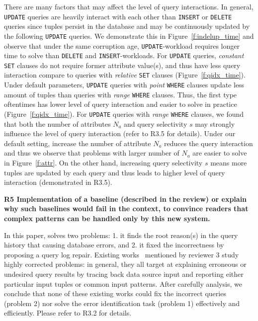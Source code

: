There are many factors that may affect the level of query interactions. In general, \texttt{UPDATE} queries are heavily interact with each other than \texttt{INSERT} or \texttt{DELETE} queries since tuples persist in the database and may be continuously updated by the following \texttt{UPDATE} queries. We demonstrate this in Figure~\ref{f:indelup_time} and observe that under the same corruption age, \texttt{UPDATE}-workload requires longer time to solve than \texttt{DELETE} and \texttt{INSERT}-workloads. For \texttt{UPDATE} queries, \textit{constant} \texttt{SET} clauses do not require former attribute value(s), and thus have less query interaction compare to queries with \textit{relative} \texttt{SET} clauses (Figure~\ref{f:qidx_time}). Under default parameters, \texttt{UPDATE} queries with \textit{point} \texttt{WHERE} clauses update less amount of tuples than queries with \textit{range} \texttt{WHERE} clauses. Thus, the first type oftentimes has lower level of query interaction and easier to solve in practice (Figure~\ref{f:qidx_time}). For \texttt{UPDATE} queries with \textit{range} \texttt{WHERE} clauses, we found that both the number of attributes $N_a$ and query selectivity $s$ may strongly influence the level of query interaction (refer to R3.5 for details). Under our default setting, increase the number of attribute $N_a$ reduces the query interaction and thus we observe that problems with larger number of $N_a$ are easier to solve in Figure~\ref{f:attr}. On the other hand, increasing query selectivity $s$ means more tuples are updated by each query and thus leads to higher level of query interaction (demonstrated in R3.5).


\noindent \textbf{R5 Implementation of a baseline (described in the review) or explain why such baselines would fail in the context, to convince readers that complex patterns can be handled only by this new system.}

In this paper, \sys solves two problems: 1. it finds the root reason(s) in the query history that causing database errors, and 2. it fixed the incorrectness by proposing a query log repair. Existing works~\cite{Wu13, roy2014formal, chalamalla2014,meliou2011tracing} mentioned by reviewer 3 study highly corrected problems: in general, they all target at explaining erroneous or undesired query results by tracing back data source input and reporting either particular input tuples or common input patterns. After carefully analysis, we conclude that none of these existing works could fix the incorrect queries (problem 2) nor solve the error identification task (problem 1) effectively and efficiently. Please refer to R3.2 for details.


